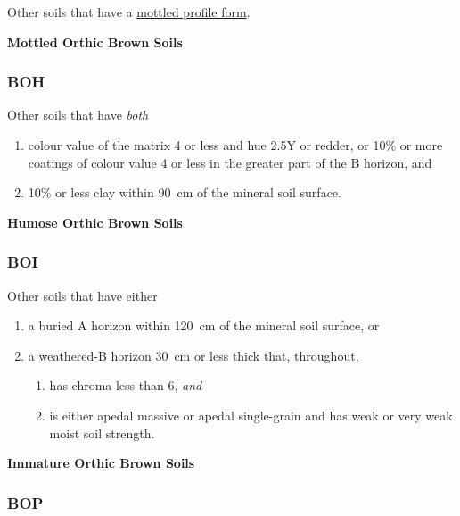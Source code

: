 \documentclass[
  letterpaper,
  DIV=11,
  numbers=noendperiod]{scrreprt}
\providecommand{\tightlist}{%
  \setlength{\itemsep}{0pt}\setlength{\parskip}{0pt}}\usepackage{longtable,booktabs,array}
\begin{document}
Other soils that have a \protect\hyperlink{sec-diag-mottpf}{mottled
profile form}.

\textbf{Mottled Orthic Brown Soils}

\hypertarget{sec-key-BOH}{%
\subsubsection{\texorpdfstring{\textbf{BOH}}{BOH}}\label{sec-key-BOH}}

Other soils that have \emph{both}

\begin{enumerate}
\def\labelenumi{\arabic{enumi}.}
\tightlist
\item
  colour value of the matrix 4 or less and hue 2.5Y or redder, or 10\%
  or more coatings of colour value 4 or less in the greater part of the
  B horizon, and
\item
  10\% or less clay within 90~cm of the mineral soil surface.
\end{enumerate}

\textbf{Humose Orthic Brown Soils}

\hypertarget{sec-key-BOI}{%
\subsubsection{\texorpdfstring{\textbf{BOI}}{BOI}}\label{sec-key-BOI}}

Other soils that have either

\begin{enumerate}
\def\labelenumi{\arabic{enumi}.}
\tightlist
\item
  a buried A horizon within 120~cm of the mineral soil surface, or
\item
  a \protect\hyperlink{sec-diag-bw}{weathered-B horizon} 30~cm or less
  thick that, throughout,

  \begin{enumerate}
  \def\labelenumii{(\alph{enumii})}
  \tightlist
  \item
    has chroma less than 6, \emph{and}
  \item
    is either apedal massive or apedal single-grain and has weak or very
    weak moist soil strength.
  \end{enumerate}
\end{enumerate}

\textbf{Immature Orthic Brown Soils}

\hypertarget{sec-key-BOP}{%
\subsubsection{\texorpdfstring{\textbf{BOP}}{BOP}}\label{sec-key-BOP}}
\end{document}
